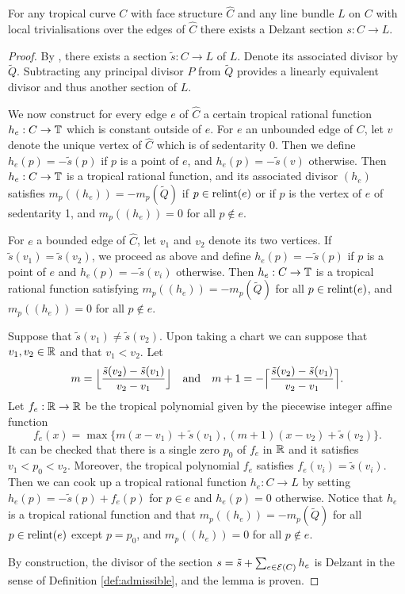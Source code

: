 \begin{lemma}\label{lem:admissiblesection} 
For any tropical curve $C$ with face structure $\hat{C}$ and any line bundle $L$ on $C$ with local trivialisations over the edges of $\hat{C}$ there exists a Delzant section $s : C \to L$. 
\end{lemma}

\begin{proof}
By \cite[Proposition 4.6]{MikZha:Jac}, there exists a section $\tilde{s}: C \to L$ of $L$. Denote its associated divisor by $\tilde{Q}$. 
Subtracting any principal divisor  $P$ from $\tilde{Q}$ provides a linearly equivalent divisor and thus another section of $L$. 

We now construct for every edge $e$ of $\hat C$ a certain tropical rational function $h_e : C \to \mathbb{T}$ which is constant outside of $e$. 
For $e$ an unbounded edge of $C$, let $v$ denote the unique vertex of $\hat{C}$ which is of sedentarity $0$. Then we define  $h_e(p) = - \tilde{s}(p) $  if $p $ is a point of $e$, and $h_e(p) = -\tilde{s}(v) $ otherwise. Then $h_e : C \to \mathbb{T}$ is a tropical rational function,  and its associated divisor $(h_e)$ satisfies $m_p((h_e)) = - m_p(\tilde{Q})$ if $p \in {\rm relint}(e)$ or if $p$ is the vertex of $e$ of sedentarity 1, and $m_p((h_e)) = 0$ for all $p \notin e$. 

For $e$ a bounded edge of $\hat{C}$, let $v_1$ and $v_2$ denote its two vertices. 
 If $\tilde{s}(v_1) = \tilde{s}(v_2)$, we   proceed as above and define $h_e(p) = - \tilde{s}(p) $  if $p $ is a point of $e$ and $h_e(p) = -\tilde{s}(v_i)$ otherwise. 
Then $h_e: C \to \mathbb{T}$ is a tropical rational function satisfying $m_p((h_e)) = - m_p(\tilde{Q})$ for all $p \in {\rm relint}(e)$, and $m_p((h_e)) = 0$ for all $p \notin e$. 

Suppose that   $\tilde{s}(v_1) \neq  \tilde{s}(v_2)$. 
Upon taking a chart we can suppose that $v_1, v_2 \in \mathbb{R}$ and that $v_1 < v_2$. Let $$m = \Bigl \lfloor \frac{\tilde{s}(v_2) -\tilde{s}(v_1)}{v_2-v_1} \Bigr\rfloor \quad \text{and} \quad m+1 = -\Bigl\lceil \frac{\tilde{s}(v_2) -\tilde{s}(v_1)}{v_2-v_1} \Bigr\rceil.$$
Let $f_e : \mathbb{R} \to \mathbb{R}$ be the  tropical polynomial given by the piecewise integer affine  function 
$$f_e(x) = \max \{ m(x- v_1) + \tilde{s}(v_1), (m+1)(x-v_2) + \tilde{s}(v_2)\}. $$ 
It can be checked that there is a single zero $p_0$ of $f_e$ in $\mathbb{R}$ and it satisfies $v_1 < p_0 <v_2$. Moreover, the tropical polynomial $f_e$ satisfies $f_e(v_i) = \tilde{s}(v_i)$. Then we can cook up a tropical rational function 
$h_e : C \to L$ by setting $h_e(p) = - \tilde{s}(p) + f_e(p)$ for $p \in e$ and $h_e(p) = 0$ otherwise. Notice that $h_e$ is a tropical rational function and that $m_p((h_e)) = - m_p(\tilde{Q})$ for all $p  \in {\rm relint}(e)$ except $p = p_0$, and $m_p((h_e)) = 0$ for all $p \notin e$.  

By construction, the divisor of the  section  $s = \tilde{s} + \sum_{e \in {\mathcal E}(C)} h_e$ is Delzant  in the sense of Definition \ref{def:admissible}, and the lemma is proven. 
\end{proof}



